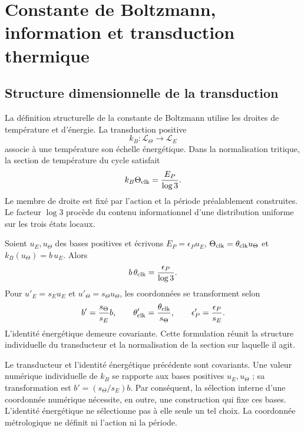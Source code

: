 \section{Constante de Boltzmann, information et transduction thermique}
\label{ii:sec:ii-boltzmann}

\subsection{Structure dimensionnelle de la transduction}

La définition structurelle de la constante de Boltzmann utilise les
droites de température et d'énergie. La transduction positive
\[
 k_B:\mathcal L_\Theta\longrightarrow\mathcal L_E
\]
associe à une température son échelle énergétique. Dans la normalisation
tritique, la section de température du cycle satisfait
\[
 k_B\Theta_{\rm clk}=\frac{E_P}{\log3}.
\]
Le membre de droite est fixé par l'action et la période préalablement
construites. Le facteur \(\log3\) procède du contenu informationnel
d'une distribution uniforme sur les trois états locaux.

Soient \(u_E,u_\Theta\) des bases positives et écrivons
\(E_P=\epsilon_Pu_E\), \(\Theta_{\rm clk}=\theta_{\rm clk}u_\Theta\)
et \(k_B(u_\Theta)=b\,u_E\). Alors
\[
 b\,\theta_{\rm clk}=\frac{\epsilon_P}{\log3}.
\]
Pour \(u'_E=s_Eu_E\) et \(u'_\Theta=s_\Theta u_\Theta\),
les coordonnées se transforment selon
\[
 b'=\frac{s_\Theta}{s_E}b,\qquad
 \theta'_{\rm clk}=\frac{\theta_{\rm clk}}{s_\Theta},\qquad
 \epsilon'_P=\frac{\epsilon_P}{s_E}.
\]
L'identité énergétique demeure covariante. Cette formulation réunit
la structure individuelle du transducteur et la normalisation de la
section sur laquelle il agit.

\begin{remark}
Le transducteur et l’identité énergétique précédente sont covariants.
Une valeur numérique individuelle de \(k_B\) se rapporte aux bases positives
\(u_E,u_\Theta\) ; sa transformation est \(b'=(s_\Theta/s_E)b\).
Par conséquent, la sélection interne d’une coordonnée numérique nécessite,
en outre, une construction qui fixe ces bases. L’identité énergétique
ne sélectionne pas à elle seule un tel choix. La coordonnée métrologique
ne définit ni l’action ni la période.
\end{remark}

